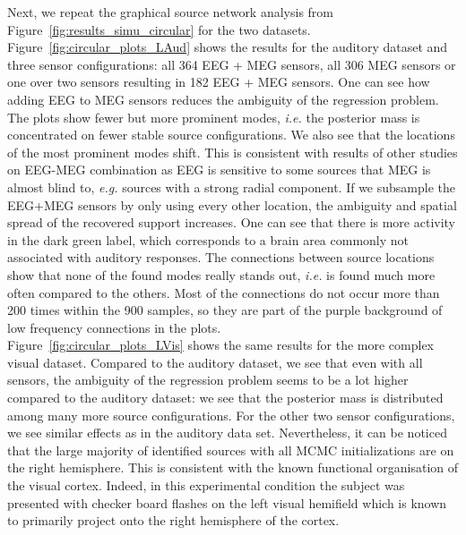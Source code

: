 Next, we repeat the graphical source network analysis from Figure~\ref{fig:results_simu_circular} for the two datasets. Figure~\ref{fig:circular_plots_LAud} shows the results for the auditory dataset and three sensor configurations: all 364 EEG + MEG sensors, all 306 MEG sensors or one over two sensors resulting in 182 EEG + MEG sensors. One can see how adding EEG to MEG sensors reduces the ambiguity of the regression problem. The plots show fewer but more prominent modes, \textit{i.e.} the posterior mass is concentrated on fewer stable source configurations. We also see that the locations of the most prominent modes shift.
This is consistent with results of other studies on EEG-MEG combination \cite{MoStBrHa08,Lu14,AyVoKuHeKuGaHaWeKeRaWoHe14} as EEG is sensitive to some sources that MEG is almost blind to, \textit{e.g.} sources with a strong radial component. If we subsample the EEG+MEG sensors by only using every other location, the ambiguity and spatial spread of the recovered support increases. One can see that there is more activity in the dark green label, which corresponds to a brain area commonly not associated with auditory responses.%
The connections between source locations show that none of the found modes really stands out, \textit{i.e.} is found much more often compared to the others. Most of the connections do not occur more than 200 times within the 900 samples, so they are part of the purple background of low frequency connections in the plots.\\
Figure~\ref{fig:circular_plots_LVis} shows the same results for the more complex visual dataset. Compared to the auditory dataset, we see that even with all sensors, the ambiguity of the regression problem seems to be a lot higher compared to the auditory dataset: we see that the posterior mass is distributed among many more source configurations. For the other two sensor configurations, we see similar effects as in the auditory data set. Nevertheless, it can be noticed that the large majority of identified sources with all MCMC initializations are on the right hemisphere. This is consistent with the known functional organisation of the visual cortex. Indeed, in this experimental condition the subject was presented with checker board flashes on the left visual hemifield which is known to primarily project onto the right hemisphere of the cortex.


